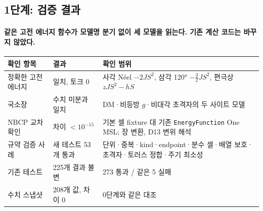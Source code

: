\subsection{1단계: 검증 결과}\label{stage1-verification}
\begingroup%
  \framesubtitle{같은 고전 에너지 함수가 모델명 분기 없이 세 모델을 읽는다. 기존 계산 코드는 바꾸지 않았다.}
  \small
  \begin{tabularx}{\textwidth}{@{}p{3.6cm}p{3.3cm}Y@{}}
    \toprule
    확인 항목 & 결과 & 확인 범위 \\
    \midrule
    정확한 고전 에너지 & 일치, 토크 0 & 사각 Néel $-2JS^2$, 삼각 120° $-\tfrac32JS^2$, 편극상 $zJS^2-hS$ \\
    국소장 & 수치 미분과 일치 & DM·비등방 $g$·비대각 초격자의 두 사이트 모델 \\
    NBCP 교차 확인 & 차이 $<10^{-15}$ & 기본 셀 fixture 대 기존 \texttt{EnergyFunction} One MSL; 장 변환, D13 변위 해석 \\
    규약 검증 사례 & 새 테스트 53개 통과 & 단위·중복·kind·endpoint·분수 셀·배열 보호·초격자·토러스 정합·주기 최소성 \\
    기존 테스트 & 225개 결과 불변 & 273 통과 / 같은 5 실패 \\
    수치 스냅샷 & 208개 값, 차이 0 & 0단계와 같은 대조 \\
    \bottomrule
  \end{tabularx}
  \par\medskip
\endgroup



